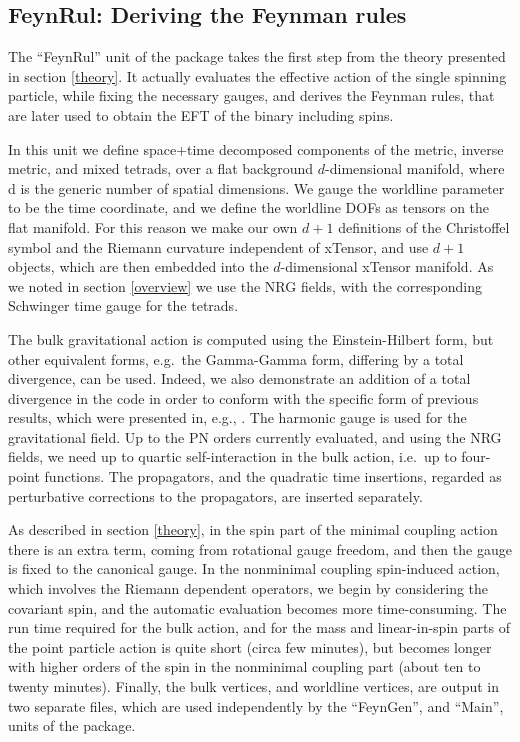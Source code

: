 \documentclass[a4paper,11pt]{article}
\begin{document}
\subsection{FeynRul: Deriving the Feynman rules}
\label{feynrul}

The ``FeynRul'' unit of the package takes the first step from the theory presented in 
section \ref{theory}. It actually evaluates the effective action of the single spinning 
particle, while fixing the necessary gauges, and derives the Feynman rules, that are later 
used to obtain the EFT of the binary including spins. 

In this unit we define space+time decomposed components of the metric, inverse metric, and 
mixed tetrads, over a flat background $d$-dimensional manifold, where d is the generic 
number of spatial dimensions. We gauge the worldline parameter to be the time coordinate, 
and we define the worldline DOFs as tensors on the flat manifold. For this reason we make 
our own $d+1$ definitions of the Christoffel symbol and the Riemann curvature independent of 
xTensor, and use $d+1$ objects, which are then embedded into the $d$-dimensional xTensor 
manifold. As we noted in section \ref{overview} we use the NRG fields, with the 
corresponding Schwinger time gauge for the tetrads.   

The bulk gravitational action is computed using the Einstein-Hilbert form, but other 
equivalent forms, e.g.~the Gamma-Gamma form, differing by a total divergence, can be used. 
Indeed, we also demonstrate an addition of a total divergence in the code in order to 
conform with the specific form of previous results, which were presented in, 
e.g., \cite{Levi:2015ixa,Levi:2015uxa,Levi:2016ofk}. The harmonic gauge is used for the 
gravitational field. Up to the PN orders currently evaluated, and using the NRG fields, we 
need up to quartic self-interaction in the bulk action, i.e.~up to four-point functions.
The propagators, and the quadratic time insertions, regarded as perturbative corrections to 
the propagators, are inserted separately. 
 
As described in section \ref{theory}, in the spin part of the minimal coupling action there 
is an extra term, coming from rotational gauge freedom, and then the gauge is fixed to the 
canonical gauge. In the nonminimal coupling spin-induced action, which involves the Riemann 
dependent operators, we begin by considering the covariant spin, and the automatic 
evaluation becomes more time-consuming. The run time required for the bulk action, and for 
the mass and linear-in-spin parts of the point particle action is quite short (circa few 
minutes), but becomes longer with higher orders of the spin in the nonminimal coupling part 
(about ten to twenty minutes). Finally, the bulk vertices, and worldline vertices, are 
output in two separate files, which are used independently by the ``FeynGen'', and ``Main'', 
units of the package. 
\end{document}
